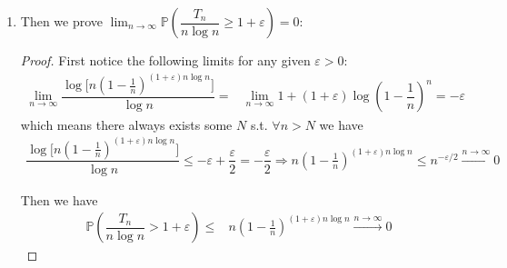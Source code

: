 \documentclass[11pt,a4paper]{article}
\numberwithin{equation}{section}%
\begin{document}
\begin{enumerate}[topsep=2pt,itemsep=2pt]
        \item Then we prove $ \displaystyle\lim_{n\to\infty} \mathbb{P}\left( \dfrac{ T_n  }{ n\log n } \mathop{ \geq  } 1+\varepsilon   \right) =0 $:
        \begin{proof}
            First notice the following limits for any given $ \varepsilon  >0 $:
            \begin{align*}
                 \lim_{n\to\infty } \dfrac{ \log \big[ n(1-\frac{1}{n})^{(1+\varepsilon  )n\log n} \big] }{ \log n } =& \lim_{n\to\infty } 1 + (1+\varepsilon  )\log \left( 1-\dfrac{ 1 }{ n }  \right)^n = -\varepsilon
            \end{align*}
            which means there always exists some $ N $ s.t. $ \forall n>N $ we have 
            \begin{align*}
                \dfrac{ \log \big[ n(1-\frac{1}{n})^{(1+\varepsilon  )n\log n} \big] }{ \log n } \leq -\varepsilon + \dfrac{ \varepsilon  }{ 2 } = -\dfrac{ \varepsilon  }{ 2 }  \Rightarrow n(1-\frac{1}{n})^{(1+\varepsilon  )n\log n} \leq n^{-\varepsilon /2} \xrightarrow[]{n\to\infty} 0
            \end{align*}
            
            Then we have
            \begin{align*}
                \mathbb{P}\left( \dfrac{ T_n }{ n\log n } > 1+\varepsilon   \right) \leq & n(1-\frac{1}{n})^{(1+\varepsilon  )n\log n} \xrightarrow[]{n\to\infty} 0 
            \end{align*}
            
        \end{proof}


\end{enumerate}
\end{document}
